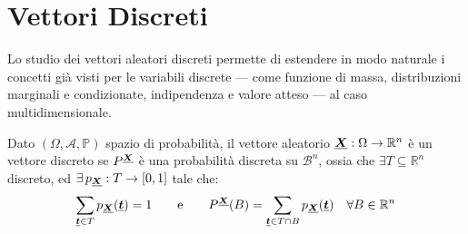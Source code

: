 \section{Vettori Discreti}
Lo studio dei vettori aleatori discreti permette di estendere in modo naturale
i concetti già visti per le variabili discrete — come funzione di massa,
distribuzioni marginali e condizionate, indipendenza e valore atteso —
al caso multidimensionale.
\begin{definizione}
    Dato $(\Omega, \mathcal{A}, \mathbb{P})$ spazio di probabilità, il vettore aleatorio $\underline{{\boldsymbol{X}}}:\Omega\to\mathbb{R}^n$ è un vettore discreto se $P^{\underline{{\boldsymbol{X}}}}$ è una probabilità discreta su $\mathcal{B}^n$, ossia che $\exists T\subseteq\mathbb{R}^n$ discreto, ed $\exists \,p_{\underline{{\boldsymbol{X}}}}:T\to [0, 1]$ tale che:
    \[\sum_{\underline{{\boldsymbol{t}}}\in T}p_{\underline{{\boldsymbol{X}}}}(\underline{{\boldsymbol{t}}}) = 1\qquad \text{e}\qquad P^{\underline{{\boldsymbol{X}}}}(B) = \sum_{\underline{{\boldsymbol{t}}}\in T\cap B}p_{\underline{{\boldsymbol{X}}}}(\underline{{\boldsymbol{t}}})\quad \forall B\in \mathbb{R}^n\]
\end{definizione}

